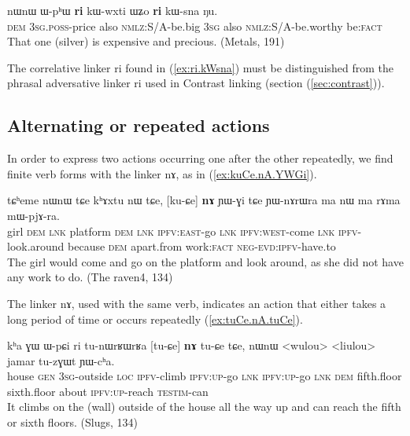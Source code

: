 \documentclass[oldfontcommands,oneside,a4paper,11pt]{article}
\newcommand{\ipa}[1]{{\phon \mbox{#1}}} %
\newcommand{\refb}[1]{(\ref{#1})}
\begin{document}
 \begin{exe}
\ex \label{ex:ri.kWsna}
\gll
\ipa{nɯnɯ}  	\ipa{ɯ-pʰɯ}  	\ipa{\textbf{ri}}  	\ipa{kɯ-wxti}  	\ipa{ɯʑo}  	\ipa{\textbf{ri}}  	\ipa{kɯ-sna}  	\ipa{ŋu.}  \\
\textsc{dem} \textsc{3sg.poss}-price also \textsc{nmlz:S/A}-be.big \textsc{3sg} also \textsc{nmlz:S/A}-be.worthy be:\textsc{fact} \\
\glt That one (silver) is expensive and precious. (Metals, 191)
\end{exe}

The correlative linker \ipa{ri} found in \refb{ex:ri.kWsna} must be distinguished from the phrasal adversative linker \ipa{ri} used in Contrast linking (section \refb{sec:contrast}).




\subsection{Alternating or repeated actions} \label{sec:alternating}

In order to express two actions occurring one after the other repeatedly, we find finite verb forms with the linker \ipa{nɤ}, as in \refb{ex:kuCe.nA.YWGi}.

\begin{exe}
\ex \label{ex:kuCe.nA.YWGi}
\gll
\ipa{tɕʰeme}  	\ipa{nɯnɯ}  	\ipa{tɕe}  	\ipa{kʰɤxtu}  	\ipa{nɯ}  	\ipa{tɕe,}  	[\ipa{ku-ɕe}]  	\ipa{\textbf{nɤ}}  	\ipa{ɲɯ-ɣi}  	\ipa{tɕe}  	\ipa{ɲɯ-nɤrɯra}  	\ipa{ma}  	\ipa{nɯ}  	\ipa{ma}  	\ipa{rɤma}  	\ipa{mɯ-pjɤ-ra.}  \\
girl \textsc{dem} \textsc{lnk} platform \textsc{dem} \textsc{lnk} \textsc{ipfv:east}-go \textsc{lnk} \textsc{ipfv:west}-come \textsc{lnk} \textsc{ipfv}-look.around because \textsc{dem} apart.from work:\textsc{fact} \textsc{neg-evd:ipfv}-have.to \\ 
\glt The girl would come and go on the platform and look around, as she did not have any work to do. (The raven4, 134)
\end{exe}


The linker \ipa{nɤ}, used with the same verb, indicates an action that either takes a long period of time or occurs repeatedly \refb{ex:tuCe.nA.tuCe}.
\begin{exe}
\ex \label{ex:tuCe.nA.tuCe}
\gll
\ipa{kʰa}  	\ipa{ɣɯ}  	\ipa{ɯ-pɕi}  	\ipa{ri}  	\ipa{tu-nɯrʁɯrʁa}  	[\ipa{tu-ɕe}]  	\ipa{\textbf{nɤ}}  	\ipa{tu-ɕe}  	\ipa{tɕe,}  	\ipa{nɯnɯ}  	<wulou>  	<liulou>  	\ipa{jamar}  	\ipa{tu-zɣɯt}  	\ipa{ɲɯ-cʰa.}  \\
house \textsc{gen} \textsc{3sg}-outside \textsc{loc} \textsc{ipfv}-climb \textsc{ipfv:up}-go \textsc{lnk} \textsc{ipfv:up}-go \textsc{lnk} \textsc{dem} fifth.floor sixth.floor about \textsc{ipfv:up}-reach \textsc{testim}-can \\
\glt It climbs on the (wall) outside of the house all the way up and can reach the fifth or   sixth floors.
(Slugs, 134)
\end{exe}
 
\end{document}
